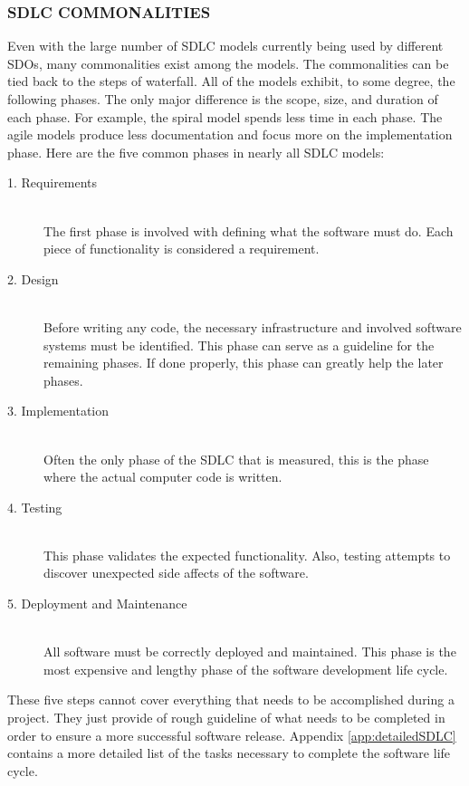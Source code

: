 \documentclass[SDSUThesis.tex]{subfiles}
\begin{document}
    \subsubsection{SDLC COMMONALITIES}
        Even with the large number of SDLC models currently being used by different SDOs,
        many commonalities exist among the models.  The 
        commonalities can be tied back to the steps of waterfall.  All of the models
        exhibit, to some degree, the following phases. The only major difference is 
        the scope, size, and duration of each phase.  For example, the spiral
        model spends less time in each phase.  The agile models produce less
        documentation and focus more on the implementation phase. Here are
        the five common phases in nearly all SDLC models:
        \begin{description}
            \item[1. Requirements] \hfill \\ The first phase is involved 
                with defining what the software must do.  Each piece of 
                functionality is considered a requirement.  
            \item[2. Design] \hfill \\ Before writing any code, the 
                necessary infrastructure and involved software systems
                must be identified. This phase can serve as a guideline for the 
                remaining phases. If done properly, this phase can greatly 
                help the later phases.
            \item[3. Implementation] \hfill \\ Often the only phase of the SDLC 
                that is measured, this is the phase where the actual computer
                code is written.
            \item[4. Testing] \hfill \\ This phase validates the expected 
                functionality.  Also, testing attempts to discover unexpected
                side affects of the software.
            \item[5. Deployment and Maintenance] \hfill \\ All software must 
                be correctly deployed and maintained.  This phase is the 
                most expensive and lengthy phase of the software
                development life cycle.
        \end{description}
        
        These five steps cannot cover everything that needs to be accomplished
        during a project.  They just provide of rough guideline of what needs
        to be completed in order to ensure a more successful software release.
        Appendix \ref{app:detailedSDLC} contains a more detailed list of the
        tasks necessary to complete the software life cycle.
        
\end{document}

